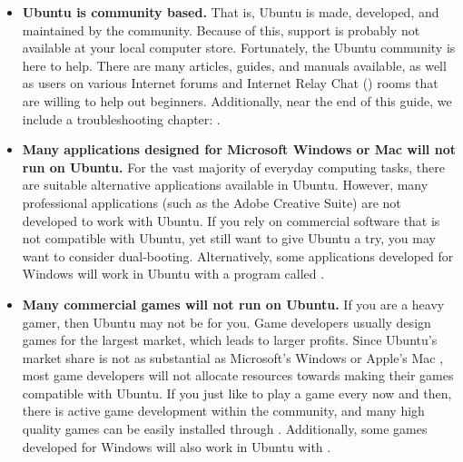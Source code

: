 \begin{itemize}
    \item \textbf{Ubuntu is community based.} That is, Ubuntu is made, developed, and maintained by the community. Because of this, support is probably not available at your local computer store. Fortunately, the Ubuntu community is here to help. There are many articles, guides, and manuals available, as well as users on various Internet forums and Internet Relay Chat () rooms that are willing to help out beginners. Additionally, near the end of this guide, we include a troubleshooting chapter: .

    \item \textbf{Many applications designed for Microsoft Windows or Mac  will not run on Ubuntu.} 
    For the vast majority of everyday computing tasks, there are suitable
    alternative applications available in Ubuntu. However, many professional
    applications (such as the Adobe Creative Suite) are not developed to work
    with Ubuntu.  If you rely on commercial software that is not compatible with
    Ubuntu, yet still want to give Ubuntu a try, you may want to consider
    \gls{dual-booting}. Alternatively, some applications developed
    for Windows will work in Ubuntu with a program called .

    \item \textbf{Many commercial games will not run on Ubuntu.} If you are a heavy gamer, then Ubuntu may not be for you. Game developers usually design games for the largest market, which leads to larger profits. Since Ubuntu's market share is not as substantial as Microsoft's Windows or Apple's Mac ,
    most game developers will not allocate resources towards making their games compatible with Ubuntu.
    If you just like to play a game every now and then, there is active game development within the community, and many high quality games can be easily installed through .  Additionally, some games developed for Windows will also work in Ubuntu with .

\end{itemize}

